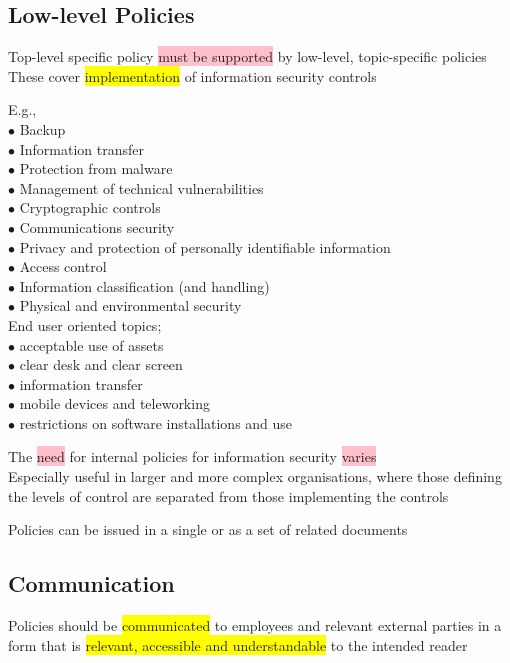 \documentclass[tikz,border=10pt]{project_plan}
\newcommand{\bulletPoint}{\hspace{-3.1pt}$\bullet$ \hspace{5pt}}
\begin{document}
\subsection{Low-level Policies}

Top-level specific policy \colorbox{pink}{must be supported} by low-level, topic-specific policies\\
These cover \colorbox{yellow}{implementation} of information security controls

E.g.,\\
\bulletPoint Backup\\
\bulletPoint Information transfer\\
\bulletPoint Protection from malware\\
\bulletPoint Management of technical vulnerabilities\\
\bulletPoint Cryptographic controls\\
\bulletPoint Communications security\\
\bulletPoint Privacy and protection of personally identifiable information \\
\bulletPoint Access control \\
\bulletPoint Information classification (and handling)\\
\bulletPoint Physical and environmental security \\
End user oriented topics;\\
\bulletPoint acceptable use of assets\\
\bulletPoint clear desk and clear screen\\
\bulletPoint information transfer\\
\bulletPoint mobile devices and teleworking\\
\bulletPoint restrictions on software installations and use

The \colorbox{pink}{need} for internal policies for information security \colorbox{pink}{varies}\\
Especially useful in larger and more complex organisations, where those defining the levels of control are separated from those implementing the controls

Policies can be issued in a single or as a set of related documents

\subsection{Communication}

Policies should be \colorbox{yellow}{communicated} to employees and relevant external parties in a form that is \colorbox{yellow}{relevant, accessible and understandable} to the intended reader
\end{document}
